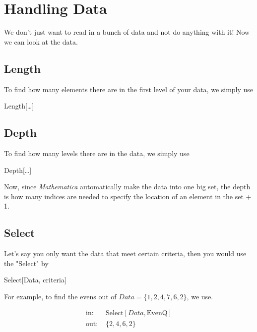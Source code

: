 \documentclass[11pt,letterpaper,twoside,titlepage]{report}
\newcommand{\Mathematica}{\textit{Mathematica} }
\begin{document}
		\chapter{Handling Data}
		
			We don't just want to read in a bunch of data and not do anything with it!  Now we can look at the data.
			
			\section{Length}			
					
				To find how many elements there are in the first level of your data, we simply use
					
				\begin{center} Length[\dots] \end{center}
					
			\section{Depth}
					
				To find how many levels there are in the data, we simply use
					
				\begin{center} Depth[\dots] \end{center}
					
				Now, since \Mathematica automatically make the data into one big set, the depth is how many indices are needed to specify the location of an element in the set + 1.
					
			\section{Select}
					
				Let's say you only want the data that meet certain criteria, then you would use the "Select" by
					
				\begin{center} Select[Data, criteria] \end{center}
					
				For example, to find the evens out of $ Data = \{1,2,4,7,6,2\} $, we use.
					
					\begin{align*}
						\text{in: }& \text{Select}[Data,\text{EvenQ}] \\
						\text{out: }& \{2,4,6,2\} \\
					\end{align*}
					
\end{document}
